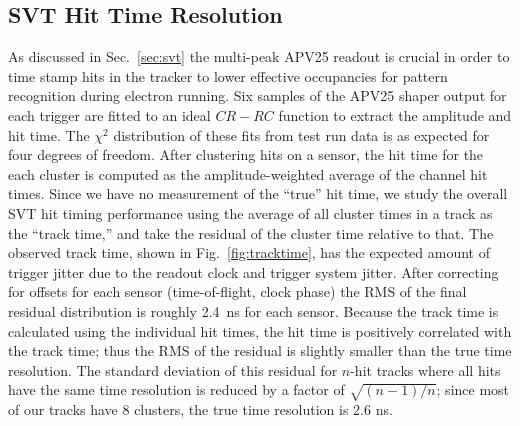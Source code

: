 \subsection*{SVT Hit Time Resolution}
As discussed in Sec.~\ref{sec:svt} the multi-peak APV25 readout is crucial in order to time stamp
hits in the tracker to lower effective occupancies for pattern recognition during electron running. 
Six samples of the APV25 shaper output for each trigger are fitted to an ideal $CR-RC$ function to 
extract the amplitude and hit time.  The $\chi^2$ distribution of these fits from test run data is as expected
for four degrees of freedom.
After clustering hits on a sensor, the hit time for the each cluster is computed as the 
amplitude-weighted average of the channel hit times. Since we have no measurement of the ``true'' hit time, we study the overall SVT hit 
timing performance using the average of all cluster times in a track as the ``track time,'' and take the
 residual of the cluster time relative to that. The observed track time, shown in Fig.~\ref{fig:tracktime}, has the expected amount of trigger jitter due to the readout clock and trigger system jitter. After correcting for offsets for each sensor (time-of-flight, clock phase) the RMS 
 of the final residual distribution is roughly 2.4~ns for each sensor. 
Because the track time is calculated using the individual hit times, the hit time is positively correlated 
with the track time; thus the RMS of the residual is slightly smaller than the true time resolution.
The standard deviation of this residual for $n$-hit tracks where all hits have the same time resolution 
is reduced by a factor of $\sqrt{(n-1)/n}$; since most of our tracks have 8 clusters, the true time 
resolution is 2.6 ns. 
